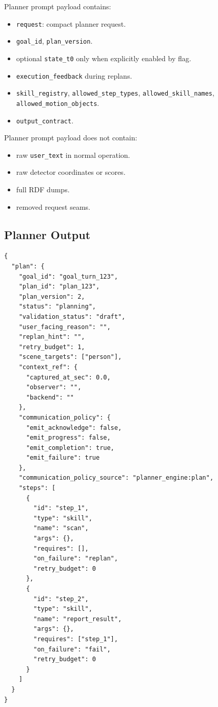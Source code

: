 \documentclass[12pt,a4paper]{article}
\newcommand{\code}[1]{\texttt{#1}}
\begin{document}
Planner prompt payload contains:

\begin{itemize}
\item \code{request}: compact planner request.
\item \code{goal\_id}, \code{plan\_version}.
\item optional \code{state\_t0} only when explicitly enabled by flag.
\item \code{execution\_feedback} during replans.
\item \code{skill\_registry}, \code{allowed\_step\_types}, \code{allowed\_skill\_names}, \code{allowed\_motion\_objects}.
\item \code{output\_contract}.
\end{itemize}

Planner prompt payload does not contain:

\begin{itemize}
\item raw \code{user\_text} in normal operation.
\item raw detector coordinates or scores.
\item full RDF dumps.
\item removed request seams.
\end{itemize}



\subsection{Planner Output}

\begin{lstlisting}
{
  "plan": {
    "goal_id": "goal_turn_123",
    "plan_id": "plan_123",
    "plan_version": 2,
    "status": "planning",
    "validation_status": "draft",
    "user_facing_reason": "",
    "replan_hint": "",
    "retry_budget": 1,
    "scene_targets": ["person"],
    "context_ref": {
      "captured_at_sec": 0.0,
      "observer": "",
      "backend": ""
    },
    "communication_policy": {
      "emit_acknowledge": false,
      "emit_progress": false,
      "emit_completion": true,
      "emit_failure": true
    },
    "communication_policy_source": "planner_engine:plan",
    "steps": [
      {
        "id": "step_1",
        "type": "skill",
        "name": "scan",
        "args": {},
        "requires": [],
        "on_failure": "replan",
        "retry_budget": 0
      },
      {
        "id": "step_2",
        "type": "skill",
        "name": "report_result",
        "args": {},
        "requires": ["step_1"],
        "on_failure": "fail",
        "retry_budget": 0
      }
    ]
  }
}
\end{lstlisting}
\end{document}
